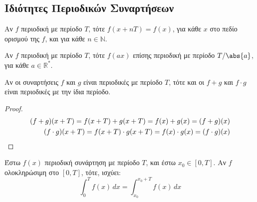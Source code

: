 \documentclass[a4paper,table]{report}
\begin{document}
    \subsection*{Ιδιότητες Περιοδικών Συναρτήσεων}

    \begin{myitemize}
      \item Αν $f$ περιοδική με περίοδο $T$, τότε $ f(x+nT) = f(x) $, για κάθε $x$ στο 
        πεδίο ορισμού της $f$, και για κάθε $ n \in \mathbb{N} $.
      \item Αν $f$ περιοδική με περίοδο $T$, τότε $ f(ax) $ επίσης περιοδική με περίοδο 
        $ T/ \abs{a} $, για κάθε $ a \in \mathbb{R}^{*} $.
    \end{myitemize}

    \begin{prop}
      Αν οι συναρτήσεις $ f $ και $g$ είναι περιοδικές με περίοδο $T$, τότε και οι 
      $ f+g $ και $ f\cdot g $ είναι περιοδικές με την ίδια περίοδο.
    \end{prop}
    \begin{proof}
      \begin{align*}
        (f+g)(x+T) = f(x+T)+g(x+T)=f(x)+g(x)=(f+g)(x) \\
        (f\cdot g)(x+T) = f(x+T)\cdot g(x+T)=f(x)\cdot g(x)=(f\cdot g)(x) \hfill
      \end{align*}
    \end{proof}

    \begin{prop}
      Έστω $ f(x) $ περιοδική συνάρτηση με περίοδο $T$, και έστω $ x_{0} \in [0,T] $. 
      Αν $f$ ολοκληρώσιμη στο $ [0,T] $, τότε, ισχύει:
      \[
        \int _{0}^{T} f(x) \,{dx} = \int _{x_{0}}^{x_{0}+T} f(x) \,{dx}  
      \] 
    \end{prop}
\end{document}
